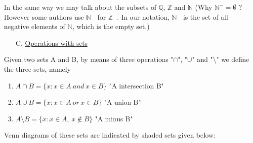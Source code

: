 \documentclass[11pt]{amsbook}
\begin{document}
In the same way we may talk about the subsets of $\mathbb{Q}$, $\mathbb{Z}$ and $\mathbb{N}$ (Why $\mathbb{N}^-=\emptyset$ ? However some authors use $\mathbb{N}^-$ for $\mathbb{Z}^-$. In our notation, $\mathbb{N}^-$ is the set of all negative elements of $\mathbb{N}$, which is the empty set.)

\begin{enumerate}
  \item[C.] \underline{Operations with sets}
\end{enumerate}

Given two sets A and B, by means of three operations "$\cap$", "$\cup$" and "$\setminus$" we define the three sets, namely

\begin{enumerate}
  \item $A\cap B=\{ x: x\in A \ and \ x\in B\}$  "A intersection B"
  \item $A\cup B=\{ x: x\in A \ or \ x\in B\}$  "A union B"
  \item $A\setminus B=\{ x: x\in A,\ x\not \in B\}$  "A minus B"
\end{enumerate}

Venn diagrams of these sets are indicated by shaded sets given below:

\par \ 
\end{document}
